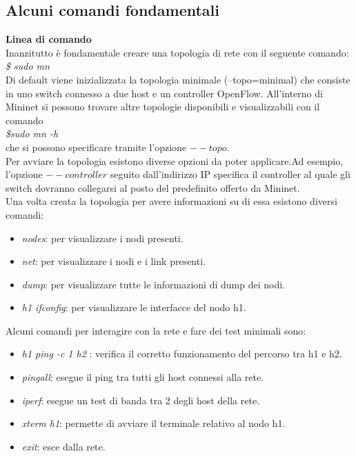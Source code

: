 \subsection{Alcuni comandi fondamentali}
\textbf{Linea di comando}
\\Inanzitutto è fondamentale creare una topologia di rete con il seguente comando\cite{walkmin}:
\\\textit{\$ sudo mn}
\\Di default viene inizializzata la topologia minimale (--topo=minimal) che consiste in uno switch connesso a due host e un controller OpenFlow.
All'interno di Mininet si possono trovare altre topologie disponibili e visualizzabili con il comando \\\textit{\$sudo mn -h} \\che si possono specificare tramite l'opzione $--topo$.
\\Per avviare la topologia esistono diverse opzioni da poter applicare.Ad esempio, l'opzione $--controller$ seguito dall'indirizzo IP specifica il controller al quale gli switch dovranno collegarsi al posto 
del predefinito offerto da Mininet.
\\Una volta creata la topologia per avere informazioni su di essa esistono diversi comandi:
\begin{itemize}
    \item \textit{ nodes}: per visualizzare i nodi presenti.
    \item \textit{ net}: per visualizzare i nodi e i link presenti.
    \item \textit{ dump}: per visualizzare tutte le informazioni di dump dei nodi.
    \item \textit{h1 ifconfig}: per visualizzare le interfacce del nodo h1.
\end{itemize}
Alcuni comandi per interagire con la rete e fare dei test minimali sono:
\begin{itemize}
    \item \textit{ h1 ping -c 1 h2 }: verifica il corretto funzionamento del percorso tra h1 e h2.
    \item \textit{ pingall}: esegue il ping tra tutti gli host connessi alla rete.
    \item \textit{ iperf}: esegue un test di banda tra 2 degli host della rete.
    \item \textit{xterm h1}: permette di avviare il terminale relativo al nodo h1.
    \item \textit{exit}: esce dalla rete.
\end{itemize}
